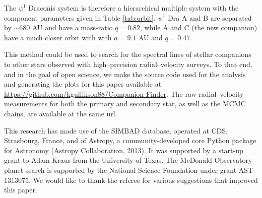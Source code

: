 The $\psi^1$ Draconis system is therefore a hierarchical multiple system with the component parameters given in Table \ref{tab:orbit}. $\psi^1$ Dra A and B are separated by ${\sim}680$ AU and have a mass-ratio $q = 0.82$, while A and C (the new companion) have a much closer orbit with with $a = 9.1$ AU and $q = 0.47$. 

This method could be used to search for the spectral lines of stellar companions to other stars observed with high--precision radial--velocity surveys. To that end, and in the goal of open science, we make the source code used for the analysis and generating the plots for this paper available at \url{https://github.com/kgullikson88/Companion-Finder}. The raw radial--velocity measurements for both the primary and secondary star, as well as the MCMC chains, are available at the same url.

This research has made use of the SIMBAD database, operated at CDS, Strasbourg, France, and of Astropy, a community-developed core Python package for Astronomy (Astropy Collaboration, 2013).
It was supported by a start-up grant to Adam Kraus from the University of Texas. The McDonald Observatory planet search is supported by the National Science Foundation under grant AST-1313075. We would like to thank the referee for various suggestions that improved this paper.


